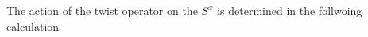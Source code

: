 \documentclass[reprint,prb,superscriptaddress]{revtex4-2}
\begin{document}
The action of the twist operator on the $S^x$ is determined in the follwoing calculation
\end{document}
